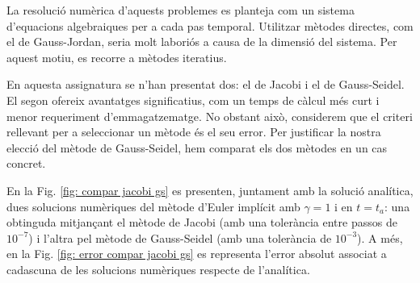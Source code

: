 \documentclass[11pt]{article}
\begin{document}
La resolució numèrica d’aquests problemes es planteja com un sistema d’equacions algebraiques per a cada pas temporal. Utilitzar mètodes directes, com el de Gauss-Jordan, seria molt laboriós a causa de la dimensió del sistema. Per aquest motiu, es recorre a mètodes iteratius.

En aquesta assignatura se n'han presentat dos: el de Jacobi i el de Gauss-Seidel. El segon ofereix avantatges significatius, com un temps de càlcul més curt i menor requeriment d'emmagatzematge. No obstant això, considerem que el criteri rellevant per a seleccionar un mètode és el seu error. Per justificar la nostra elecció del mètode de Gauss-Seidel, hem comparat els dos mètodes en un cas concret.

En la Fig. \ref{fig: compar jacobi gs} es presenten, juntament amb la solució analítica, dues solucions numèriques del mètode d'Euler implícit amb $\gamma=1$ i en $t=t_a$: una obtinguda mitjançant el mètode de Jacobi (amb una tolerància entre passos de $10^{-7}$) i l'altra pel mètode de Gauss-Seidel (amb una tolerància de $10^{-3}$). A més, en la Fig. \ref{fig: error compar jacobi gs} es representa l'error absolut associat a cadascuna de les solucions numèriques respecte de l'analítica.
\end{document}

